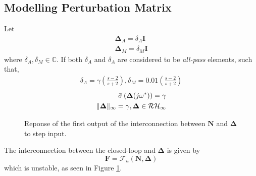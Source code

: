 \subsection{Modelling Perturbation Matrix}
Let
\begin{align*}
    \bm{\Delta}_A = \delta_A\bm{I}\\
    \bm{\Delta}_M = \delta_M\bm{I}
\end{align*}
where $\delta_A, \delta_M \in \mathbb{C}$. If both $\delta_A$ and $\delta_A$ are considered to be \emph{all-pass} elements, such that,
\begin{align*}
    \delta_A = \gamma\left(\frac{s-2}{s+2}\right),
    \delta_M = 0.01\left(\frac{s-2}{s+2}\right)
\end{align*}
\begin{align*}
    \Bar{\sigma}\left(\bm{\Delta}(j\omega^*)\right) = \gamma\\ 
    \|\bm{\Delta}\|_{\infty} = \gamma,
    \bm{\Delta} \in \mathcal{RH}_{\infty}
\end{align*}
    
\begin{figure}[h!]
    \centering
    \scalebox{0.7}{\begin{tikzpicture}
        
    \end{tikzpicture}}
    \caption{Reponse of the first output of the interconnection between $\mathbf{N}$ and $\mathbf{\Delta}$ to step input.}
    \label{Fres}
\end{figure}

The interconnection between the closed-loop and $\mathbf{\Delta}$ is given by $$\bm{F} = \mathcal{F}_u(\bm{N},\bm{\Delta})$$ which is unstable, as seen in Figure \ref{Fres}.
